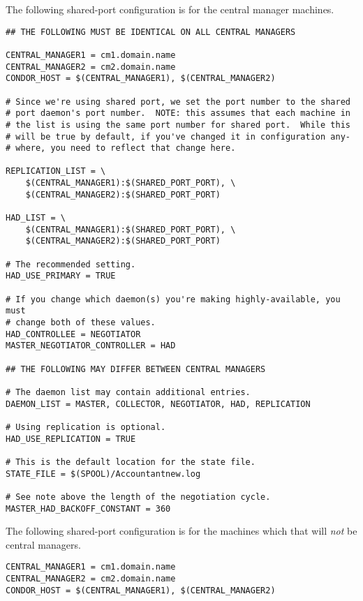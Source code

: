 The following shared-port configuration is for the central manager machines.
\footnotesize
\begin{verbatim}
## THE FOLLOWING MUST BE IDENTICAL ON ALL CENTRAL MANAGERS

CENTRAL_MANAGER1 = cm1.domain.name
CENTRAL_MANAGER2 = cm2.domain.name
CONDOR_HOST = $(CENTRAL_MANAGER1), $(CENTRAL_MANAGER2)

# Since we're using shared port, we set the port number to the shared
# port daemon's port number.  NOTE: this assumes that each machine in
# the list is using the same port number for shared port.  While this
# will be true by default, if you've changed it in configuration any-
# where, you need to reflect that change here.

REPLICATION_LIST = \
	$(CENTRAL_MANAGER1):$(SHARED_PORT_PORT), \
	$(CENTRAL_MANAGER2):$(SHARED_PORT_PORT)

HAD_LIST = \
	$(CENTRAL_MANAGER1):$(SHARED_PORT_PORT), \
	$(CENTRAL_MANAGER2):$(SHARED_PORT_PORT)

# The recommended setting.
HAD_USE_PRIMARY = TRUE

# If you change which daemon(s) you're making highly-available, you must
# change both of these values.
HAD_CONTROLLEE = NEGOTIATOR
MASTER_NEGOTIATOR_CONTROLLER = HAD

## THE FOLLOWING MAY DIFFER BETWEEN CENTRAL MANAGERS

# The daemon list may contain additional entries.
DAEMON_LIST = MASTER, COLLECTOR, NEGOTIATOR, HAD, REPLICATION

# Using replication is optional.
HAD_USE_REPLICATION = TRUE

# This is the default location for the state file.
STATE_FILE = $(SPOOL)/Accountantnew.log

# See note above the length of the negotiation cycle.
MASTER_HAD_BACKOFF_CONSTANT = 360
\end{verbatim}
\normalsize

The following shared-port configuration is for the machines which that will
\emph{not} be central managers.
\footnotesize
\begin{verbatim}
CENTRAL_MANAGER1 = cm1.domain.name
CENTRAL_MANAGER2 = cm2.domain.name
CONDOR_HOST = $(CENTRAL_MANAGER1), $(CENTRAL_MANAGER2)
\end{verbatim}
\normalsize


